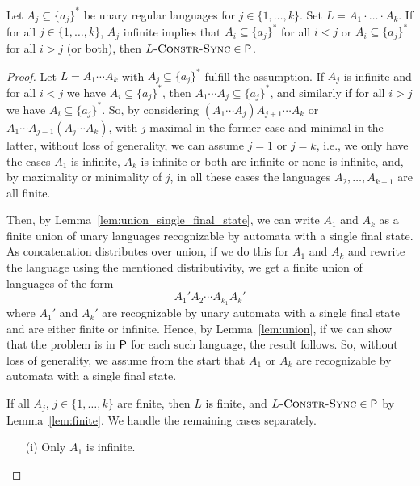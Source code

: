 \begin{propositionrep}
\label{prop:stricly_bounded_P}
 Let $A_j \subseteq \{a_j\}^*$ be unary regular languages
 for $j \in \{1,\ldots, k\}$.
 Set $L = A_1 \cdot\ldots\cdot A_k$.
 If for all $j \in \{1,\ldots, k\}$, $A_j$ infinite implies that $A_i \subseteq \{a_j\}^*$
 for all $i < j$ or $A_i \subseteq \{a_j\}^*$ for all $i > j$ (or both), then $L\textsc{-Constr-Sync} \in \textsf{P}$. 
\end{propositionrep} 
\begin{proof}
 Let $L = A_1 \cdots A_k$ with $A_j \subseteq \{a_j\}^*$ fulfill the assumption.
 If $A_j$ is infinite and for all $i < j$ we have $A_i \subseteq \{a_j\}^*$,
 then $A_1 \cdots A_j \subseteq \{a_j\}^*$, and similarly if
 for all $i > j$ we have $A_i \subseteq \{a_j\}^*$.
 So, by considering $(A_1 \cdots A_j) A_{j+1} \cdots A_k$
 or $A_1 \cdots A_{j-1} (A_j \cdots A_k)$, with $j$ maximal in the former case and minimal in the latter,
 without loss of generality, we can assume $j = 1$
 or $j = k$, i.e., we only have the cases $A_1$
 is infinite, $A_k$ is infinite or both are infinite or none is infinite,
 and, by maximality or minimality of $j$,
 in all these cases the languages $A_2, \ldots, A_{k-1}$ are all finite.
 
 
 
 
 Then, by Lemma~\ref{lem:union_single_final_state}, we can write $A_1$ and $A_k$
 as a finite union of unary languages recognizable by automata with a single final state.
 As concatenation distributes over union, if we do this for
 $A_1$ and $A_k$ and rewrite the language using the mentioned distributivity,
 we get a finite union of languages of the form
 \[
  A_1' A_2 \cdots A_{k_1} A_k'
 \]
 where $A_1'$ and $A_k'$ are recognizable by unary automata with a single final state
 and are either finite or infinite. Hence, by Lemma~\ref{lem:union},
 if we can show that the problem is in $\textsf{P}$ for each such language,
 the result follows. 
 So, without loss of generality, we assume
 from the start that $A_1$ or $A_k$ are recognizable by automata
 with a single final state.
 
 
 If all $A_j$, $j \in \{1,\ldots,k\}$ are finite, then $L$ is finite, and $L\textsc{-Constr-Sync}\in \textsf{P}$
 by Lemma~\ref{lem:finite}.
 We handle the remaining cases separately.
 
 \begin{enumerate}
 \item[(i)] Only $A_1$ is infinite.
  

\end{enumerate}
\end{proof}
